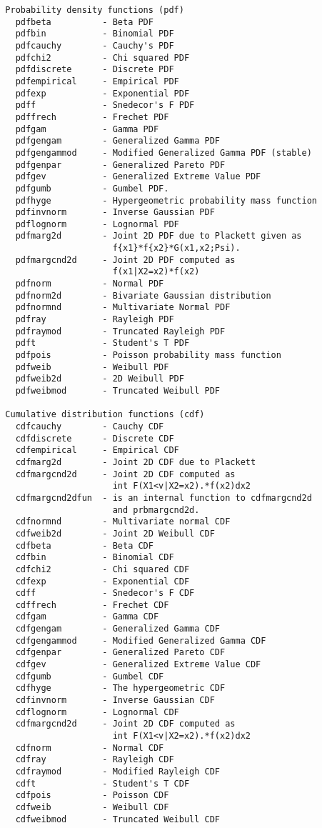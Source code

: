 {\begin{verbatim}
  Probability density functions (pdf)
    pdfbeta          - Beta PDF
    pdfbin           - Binomial PDF
    pdfcauchy        - Cauchy's PDF
    pdfchi2          - Chi squared PDF
    pdfdiscrete      - Discrete PDF
    pdfempirical     - Empirical PDF
    pdfexp           - Exponential PDF
    pdff             - Snedecor's F PDF
    pdffrech         - Frechet PDF
    pdfgam           - Gamma PDF
    pdfgengam        - Generalized Gamma PDF
    pdfgengammod     - Modified Generalized Gamma PDF (stable)
    pdfgenpar        - Generalized Pareto PDF
    pdfgev           - Generalized Extreme Value PDF
    pdfgumb          - Gumbel PDF.
    pdfhyge          - Hypergeometric probability mass function
    pdfinvnorm       - Inverse Gaussian PDF
    pdflognorm       - Lognormal PDF
    pdfmarg2d        - Joint 2D PDF due to Plackett given as
                       f{x1}*f{x2}*G(x1,x2;Psi).
    pdfmargcnd2d     - Joint 2D PDF computed as
                       f(x1|X2=x2)*f(x2)
    pdfnorm          - Normal PDF
    pdfnorm2d        - Bivariate Gaussian distribution
    pdfnormnd        - Multivariate Normal PDF
    pdfray           - Rayleigh PDF
    pdfraymod        - Truncated Rayleigh PDF
    pdft             - Student's T PDF
    pdfpois          - Poisson probability mass function
    pdfweib          - Weibull PDF
    pdfweib2d        - 2D Weibull PDF
    pdfweibmod       - Truncated Weibull PDF

  Cumulative distribution functions (cdf)
    cdfcauchy        - Cauchy CDF
    cdfdiscrete      - Discrete CDF
    cdfempirical     - Empirical CDF
    cdfmarg2d        - Joint 2D CDF due to Plackett
    cdfmargcnd2d     - Joint 2D CDF computed as
                       int F(X1<v|X2=x2).*f(x2)dx2
    cdfmargcnd2dfun  - is an internal function to cdfmargcnd2d
                       and prbmargcnd2d.
    cdfnormnd        - Multivariate normal CDF
    cdfweib2d        - Joint 2D Weibull CDF
    cdfbeta          - Beta CDF
    cdfbin           - Binomial CDF
    cdfchi2          - Chi squared CDF
    cdfexp           - Exponential CDF
    cdff             - Snedecor's F CDF
    cdffrech         - Frechet CDF
    cdfgam           - Gamma CDF
    cdfgengam        - Generalized Gamma CDF
    cdfgengammod     - Modified Generalized Gamma CDF
    cdfgenpar        - Generalized Pareto CDF
    cdfgev           - Generalized Extreme Value CDF
    cdfgumb          - Gumbel CDF
    cdfhyge          - The hypergeometric CDF
    cdfinvnorm       - Inverse Gaussian CDF
    cdflognorm       - Lognormal CDF
    cdfmargcnd2d     - Joint 2D CDF computed as
                       int F(X1<v|X2=x2).*f(x2)dx2
    cdfnorm          - Normal CDF
    cdfray           - Rayleigh CDF
    cdfraymod        - Modified Rayleigh CDF
    cdft             - Student's T CDF
    cdfpois          - Poisson CDF
    cdfweib          - Weibull CDF
    cdfweibmod       - Truncated Weibull CDF


\end{verbatim}}
